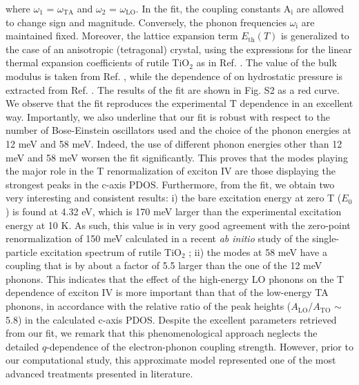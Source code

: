 \documentclass[aps,prl,twocolumn,amsfonts,nobibnotes,superscriptaddress,showpacs]{revtex4-1}
\begin{document}
where $\omega_1$ = $\omega_\mathrm{{TA}}$ and $\omega_2$ = $\omega_\mathrm{{LO}}$. In the fit, the coupling constants A$_\mathrm{i}$ are allowed to change sign and magnitude. Conversely, the phonon frequencies $\omega_\mathrm{i}$ are maintained fixed. Moreover, the lattice expansion term $E\mathrm{_{th}}(T)$ is generalized to the case of an anisotropic (tetragonal) crystal, using the expressions for the linear thermal expansion coefficients of rutile TiO$_2$ as in Ref. \cite{rao1970thermal}. The value of the bulk modulus is taken from Ref. \cite{manghnani1969elastic}, while the dependence of on hydrostatic pressure is extracted from Ref. \cite{yin2010effective}. The results of the fit are shown in Fig. S2 as a red curve. We observe that the fit reproduces the experimental T dependence in an excellent way. Importantly, we also underline that our fit is robust with respect to the number of Bose-Einstein oscillators used and the choice of the phonon energies at 12 meV and 58 meV. Indeed, the use of different phonon energies other than 12 meV and 58 meV worsen the fit significantly. This proves that the modes playing the major role in the T renormalization of exciton IV are those displaying the strongest peaks in the c-axis PDOS. Furthermore, from the fit, we obtain two very interesting and consistent results: i) the bare excitation energy at zero T ($E\mathrm{_0}$) is found at 4.32 eV, which is 170 meV larger than the experimental excitation energy at 10 K. As such, this value is in very good agreement with the zero-point renormalization of 150 meV calculated in a recent \textit{ab initio} study of the single-particle excitation spectrum of rutile TiO$_2$ \cite{monserrat2016correlation}; ii) the modes at 58 meV have a coupling that is by about a factor of 5.5 larger than the one of the 12 meV phonons. This indicates that the effect of the high-energy LO phonons on the T dependence of exciton IV is more important than that of the low-energy TA phonons, in accordance with the relative ratio of the peak heights ($A\mathrm{_{LO}}$/$A\mathrm{_{TO}}$ $\sim$ 5.8) in the calculated c-axis PDOS. Despite the excellent parameters retrieved from our fit, we remark that this phenomenological approach neglects the detailed $q$-dependence of the electron-phonon coupling strength. However, prior to our computational study, this approximate model represented one of the most advanced treatments presented in literature. 






\end{document}
